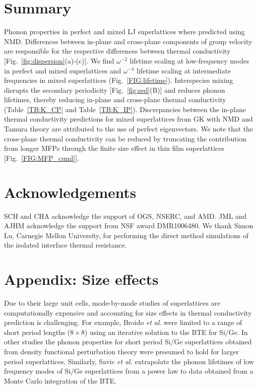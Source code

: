 \documentclass[aps,prb,preprint,preprintnumbers,amsmath,amssymb,floatfix,superscriptaddress]{revtex4}
\begin{document}

\section{Summary}

Phonon properties in perfect and mixed LJ superlattices where predicted using NMD. Differences between in-plane and cross-plane components of group velocity are responsible for the respective differences between thermal conductivity [Fig.~\ref{fig:dispersion}(a)-(c)]. We find $\omega^{-2}$ lifetime scaling at low-frequency modes in perfect and mixed superlattices and $\omega^{-4}$  lifetime scaling at intermediate frequencies in mixed superlattices (Fig.~\ref{FIG:lifetime}). Interspecies mixing disrupts the secondary periodicity [Fig.~\ref{fig:sed}(B)] and reduces phonon lifetimes, thereby reducing in-plane and cross-plane thermal conductivity (Table~\ref{TB:K_CP} and Table~\ref{TB:K_IP}). Discrepancies between the in-plane thermal conductivity predictions for mixed superlattices from GK with NMD and Tamura theory are attributed to the use of perfect eigenvectors. We note that the cross-plane thermal conductivity can be reduced by truncating the contribution from longer MFPs through the finite size effect in thin film superlattices [Fig.~\ref{FIG:MFP_cuml}].

\section{Acknowledgements}
SCH and CHA acknowledge the support of OGS, NSERC, and AMD. JML and AJHM acknowledge the support from NSF award DMR1006480. We thank Simon Lu, Carnegie Mellon University, for performing the direct method simulations of the isolated interface thermal resistance.

\newpage
\section*{Appendix: Size effects}
Due to their large unit cells, mode-by-mode studies of superlattices are computationally expensive and accounting for size effects in thermal conductivity prediction is challenging. For example, Broido \textit{et al}. were limited to a range of short period lengths ($8\times 8$) using an iterative solution to the BTE for Si/Ge.\cite {PhysRevB.70.081310} In other studies the phonon properties for short period Si/Ge superlattices obtained from density functional perturbation theory were presumed to hold for larger period superlattices.\cite{Luckyanova16112012, doi:10.1021/nl202186y} Similarly, Savic \textit{et al.} extrapolate the phonon lifetimes of low frequency modes of Si/Ge superlattices from a power law to data obtained from a Monte Carlo integration of the BTE.\cite{savic:073113} 
\end{document}
